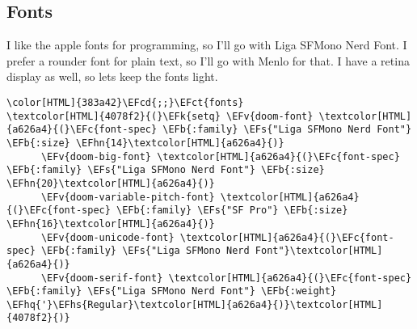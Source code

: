 \documentclass{scrartcl}
\newcommand{\EFk}[1]{\textcolor{EFk}{#1}} %
\newcommand{\EFs}[1]{\textcolor{EFs}{#1}} %
\newcommand{\EFb}[1]{\textcolor{EFb}{#1}} %
\newcommand{\EFct}[1]{\textcolor{EFct}{#1}} %
\newcommand{\EFc}[1]{\textcolor{EFc}{#1}} %
\newcommand{\EFv}[1]{\textcolor{EFv}{#1}} %
\newcommand{\EFcd}[1]{\textcolor{EFcd}{#1}} %
\newcommand{\EFhn}[1]{\textcolor{EFhn}{\textbf{#1}}} %
\newcommand{\EFhq}[1]{\textcolor{EFhq}{#1}} %
\newcommand{\EFhs}[1]{\textcolor{EFhs}{#1}} %
\begin{document}
\subsection{Fonts}
\label{sec:org6798c00}
I like the apple fonts for programming, so I'll go with Liga SFMono Nerd Font. I prefer a rounder font for plain text, so I'll go with Menlo for that. I have a retina display as well, so lets keep the fonts light.
\begin{Code}
\begin{Verbatim}[]
\color[HTML]{383a42}\EFcd{;;}\EFct{fonts}
\textcolor[HTML]{4078f2}{(}\EFk{setq} \EFv{doom-font} \textcolor[HTML]{a626a4}{(}\EFc{font-spec} \EFb{:family} \EFs{"Liga SFMono Nerd Font"} \EFb{:size} \EFhn{14}\textcolor[HTML]{a626a4}{)}
      \EFv{doom-big-font} \textcolor[HTML]{a626a4}{(}\EFc{font-spec} \EFb{:family} \EFs{"Liga SFMono Nerd Font"} \EFb{:size} \EFhn{20}\textcolor[HTML]{a626a4}{)}
      \EFv{doom-variable-pitch-font} \textcolor[HTML]{a626a4}{(}\EFc{font-spec} \EFb{:family} \EFs{"SF Pro"} \EFb{:size} \EFhn{16}\textcolor[HTML]{a626a4}{)}
      \EFv{doom-unicode-font} \textcolor[HTML]{a626a4}{(}\EFc{font-spec} \EFb{:family} \EFs{"Liga SFMono Nerd Font"}\textcolor[HTML]{a626a4}{)}
      \EFv{doom-serif-font} \textcolor[HTML]{a626a4}{(}\EFc{font-spec} \EFb{:family} \EFs{"Liga SFMono Nerd Font"} \EFb{:weight} \EFhq{'}\EFhs{Regular}\textcolor[HTML]{a626a4}{)}\textcolor[HTML]{4078f2}{)}
\end{Verbatim}
\end{Code}
\end{document}
